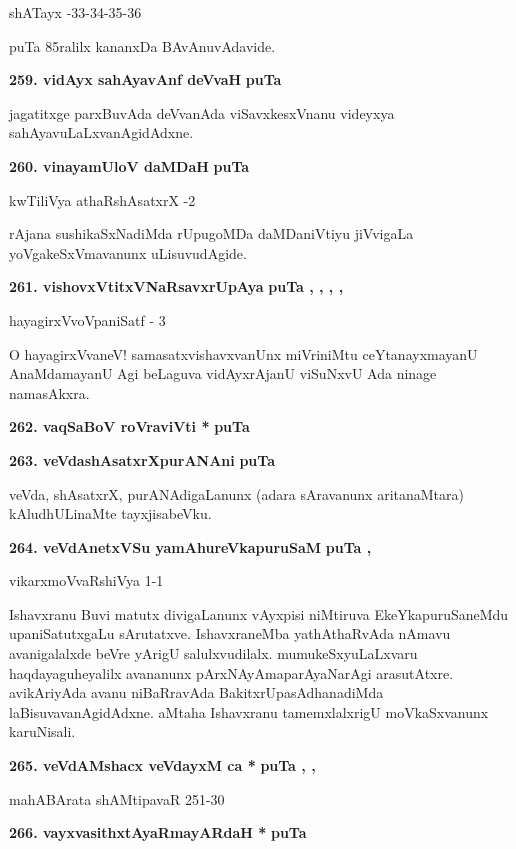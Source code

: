 \hfill{shATayx -33-34-35-36}

\smallskip
puTa 85ralilx kananxDa BAvAnuvAdavide.

\medskip
\noindent
\textbf{259. vidAyx sahAyavAnf deVvaH} \hfill{\bf puTa \pageref{86}}

\smallskip
jagatitxge parxBuvAda deVvanAda viSavxkesxVnanu videyxya sahAyavuLaLxvanAgidAdxne.

\medskip
\noindent
\textbf{260. vinayamUloV daMDaH} \hfill{\bf puTa \pageref{93}}

\hfill{kwTiliVya athaRshAsatxrX -2}

\smallskip
rAjana sushikaSxNadiMda rUpugoMDa daMDaniVtiyu jiVvigaLa yoVgakeSxVma\-vanunx uLisuvudAgide.

\medskip
\noindent
\textbf{261. vishovxVtitxVNaRsavxrUpAya} \hfill{\bf puTa \pageref{19}, \pageref{65}, \pageref{69}, \pageref{102}, \pageref{128}}

\hfill{hayagirxVvoVpaniSatf - 3}

\smallskip
O hayagirxVvaneV! samasatxvishavxvanUnx miVriniMtu ceYtanayxmayanU AnaMda\-mayanU Agi beLaguva vidAyxrAjanU viSuNxvU Ada ninage namasAkxra.

\medskip
\noindent
\textbf{262. vaqSaBoV roVraviVti *} \hfill{\bf puTa \pageref{117}}

\eject

\noindent
\textbf{263. veVdashAsatxrXpurANAni} \hfill{\bf puTa \pageref{42}}

\smallskip
veVda, shAsatxrX, purANAdigaLanunx (adara sAravanunx aritanaMtara) kAludhULi\-naMte tayxjisabeVku.

\medskip
\noindent
\textbf{264. veVdAnetxVSu yamAhureVkapuruSaM} \hfill{\bf puTa \pageref{232}, \pageref{243}}

\hfill{vikarxmoVvaRshiVya 1-1}

\smallskip
Ishavxranu Buvi matutx divigaLanunx vAyxpisi niMtiruva EkeYkapuruSaneMdu upaniSatutxgaLu sAru\-tatxve. IshavxraneMba yathAthaRvAda nAmavu avanigalalxde beVre yArigU salulxvudilalx. mumukeSx\-yuLaLx\-varu haqdayaguheyalilx avananunx pArxNAyAmaparAyaNarAgi arasutAtxre. avikAriyAda avanu niBaR\-ravAda BakitxrUpasAdhanadiMda laBisuvavanAgidAdxne. aMtaha Ishavxranu tamemxlalxrigU moVkaSxvanunx karuNisali.

\medskip
\noindent
\textbf{265. veVdAMshacx veVdayxM ca *} \hfill{\bf puTa \pageref{133}, \pageref{144}, \pageref{181}}

\hfill{mahABArata shAMtipavaR 251-30}

\medskip
\noindent
\textbf{266. vayxvasithxtAyaRmayARdaH *} \hfill{\bf puTa \pageref{90}}

